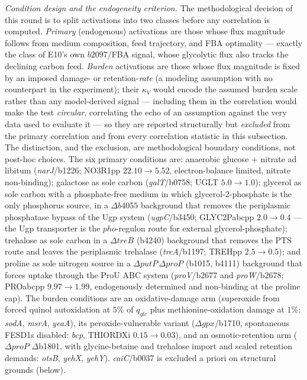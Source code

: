 \documentclass[11pt,a4paper]{article}
\theoremstyle{plain}
\theoremstyle{definition}
\theoremstyle{remark}
\begin{document}
\emph{Condition design and the endogeneity criterion.} The
methodological decision of this round is to split activations into
two classes before any correlation is computed. \emph{Primary}
(endogenous) activations are those whose flux magnitude follows from
medium composition, feed trajectory, and FBA optimality --- exactly
the class of E10's own $b2097$/FBA signal, whose glycolytic flux
also tracks the declining carbon feed. \emph{Burden} activations are
those whose flux magnitude is fixed by an imposed damage- or
retention-\emph{rate} (a modeling assumption with no counterpart in
the experiment); their $\kappa_V$ would encode the assumed burden
scale rather than any model-derived signal --- including them in the
correlation would make the test \emph{circular}, correlating the
echo of an assumption against the very data used to evaluate it ---
so they are reported structurally but \emph{excluded} from the
primary correlation and from every correlation statistic in this
subsection. The distinction, and the exclusion, are methodological
boundary conditions, not post-hoc choices. The
six primary conditions are: anaerobic glucose + nitrate ad libitum
(\emph{narJ}/b1226; NO3R1pp $22.10 \to 5.52$, electron-balance
limited, nitrate non-binding); galactose as sole carbon
(\emph{galT}/b0758; UGLT $5.0 \to 1.0$); glycerol as sole carbon with
a phosphate-free medium in which glycerol-2-phosphate is the only
phosphorus source, in a $\Delta b4055$ background that removes the
periplasmic phosphatase bypass of the Ugp system
(\emph{ugpC}/b3450; GLYC2Pabcpp $2.0 \to 0.4$ --- the Ugp transporter
is the $\mathit{pho}$-regulon route for external
glycerol-phosphate); trehalose as sole carbon in a
$\Delta\mathit{treB}$ (b4240) background that removes the PTS route
and leaves the periplasmic trehalase (\emph{treA}/b1197; TREHpp
$2.5 \to 0.5$); and proline as sole nitrogen source in a
$\Delta\mathit{putP}\,\Delta\mathit{proP}$ (b1015, b4111) background
that forces uptake through the ProU ABC system
(\emph{proV}/b2677 and \emph{proW}/b2678; PROabcpp $9.97 \to 1.99$,
endogenously determined and non-binding at the proline cap). The
burden conditions are an oxidative-damage arm (superoxide from forced
quinol autoxidation at $5\%$ of $q_{glc}$ plus methionine-oxidation
damage at $1\%$: \emph{sodA}, \emph{msrA}, \emph{yeaA}), its
peroxide-vulnerable variant ($\Delta\mathit{gpx}$/b1710, spontaneous
FESD1s disabled: \emph{bcp}, THIORDXi $0.15 \to 0.03$), and an
osmotic-retention arm ($\Delta\mathit{proP}$ $\Delta$b1801, with
glycine-betaine and trehalose import and scaled retention demands:
\emph{otsB}, \emph{yehX}, \emph{yehY}). \emph{caiC}/b0037 is excluded
a priori on structural grounds (below).
\end{document}

